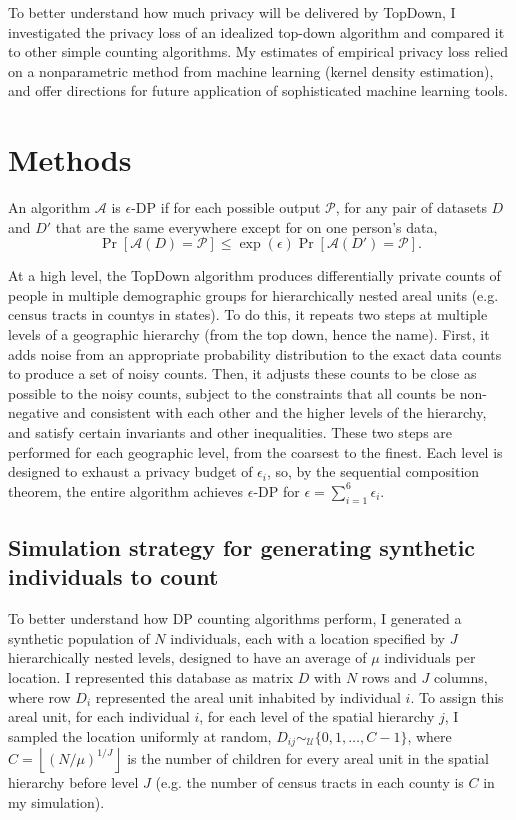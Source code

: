 \documentclass{article}
\begin{document}
To better understand how much privacy will be delivered by TopDown, I investigated the privacy loss of an idealized top-down algorithm and compared it to other simple counting algorithms.  My estimates of empirical privacy loss relied on a nonparametric method from machine learning (kernel density estimation), and offer directions for future application of sophisticated machine learning tools.

\section{Methods}
\label{methods}

An algorithm $\mathcal{A}$ is $\epsilon$-DP if for each possible output
$\mathcal{P}$, for any pair of datasets $D$ and $D'$ that are the same
everywhere except for on one person's data,
$$
\Pr\left[\mathcal{A}(D) = \mathcal{P}\right]
\leq \exp\left(\epsilon\right)
\Pr\left[\mathcal{A}(D') = \mathcal{P}\right].
$$

At a high level, the TopDown algorithm produces differentially private counts of people in multiple
demographic groups for hierarchically nested areal units (e.g. census tracts in countys in states).
To do this, it repeats two steps at multiple levels of a geographic
hierarchy (from the top down, hence the name). First,
it adds noise from an appropriate probability distribution
to the exact data counts to produce a set of noisy counts. Then, it adjusts
these counts to
be close as possible to the noisy counts, subject to the constraints
that all counts be non-negative and consistent with each other and the higher levels
of the hierarchy, and satisfy certain invariants and other inequalities.  These
two steps are performed for each geographic level, from the coarsest
to the finest.  Each level is designed to exhaust a privacy budget of $\epsilon_i$,
so, by the sequential composition theorem, 
the entire algorithm achieves $\epsilon$-DP for $\epsilon=\sum_{i=1}^6
\epsilon_i$.

\subsection{Simulation strategy for generating synthetic individuals to count}
To better understand how DP counting algorithms perform, I generated a synthetic population of $N$ individuals, each with a location specified by $J$ hierarchically nested levels, designed to have an average of $\mu$ individuals per location.
I represented this database as matrix $D$ with $N$ rows and $J$ columns, where row $D_i$ represented the areal unit inhabited by individual $i$.
To assign this areal unit, for each individual $i$, for each level of the spatial hierarchy $j$, I sampled the location uniformly at random, $D_{ij} \sim_{\mathcal{U}} \{0, 1, \ldots, C-1\}$, where $C = \left\lfloor \left(N/\mu\right)^{1/J} \right\rfloor$ is the number of children for every areal unit in the spatial hierarchy before level $J$ (e.g. the number of census tracts in each county is $C$ in my simulation).
\end{document}
